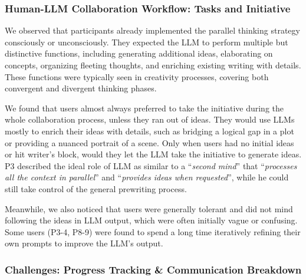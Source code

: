 \subsubsection{Human-LLM Collaboration Workflow: Tasks and Initiative} \label{the_usage_of_LLMs_for_prewriting}
We observed that participants already implemented the parallel thinking strategy consciously or unconsciously.
They expected the LLM to perform multiple but distinctive functions, including generating additional ideas, elaborating on concepts, organizing fleeting thoughts, and enriching existing writing with details.
These functions were typically seen in creativity processes, covering both convergent and divergent thinking phases.

We found that users almost always preferred to take the initiative during the whole collaboration process, unless they ran out of ideas. They would use LLMs mostly to enrich their ideas with details, such as bridging a logical gap in a plot or providing a nuanced portrait of a scene.
Only when users had no initial ideas or hit writer's block, would they let the LLM take the initiative to generate ideas. P3 described the ideal role of LLM as similar to a ``\textit{second mind}'' that ``\textit{processes all the context in parallel}'' and ``\textit{provides ideas when requested}'', while he could still take control of the general prewriting process.

Meanwhile, we also noticed that users were generally tolerant and did not mind following the ideas in LLM output, which were often initially vague or confusing. Some users (P3-4, P8-9) were found to spend a long time iteratively refining their own prompts to improve the LLM's output.

\subsubsection{Challenges: Progress Tracking \& Communication Breakdown} \label{progress_tracking}
